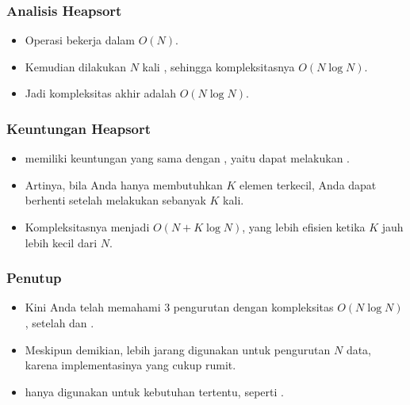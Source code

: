 \begin{frame}
\frametitle{Analisis Heapsort}
\begin{itemize}
  \item Operasi  bekerja dalam $O(N)$.
  \item Kemudian dilakukan $N$ kali , sehingga kompleksitasnya $O(N\log{N})$.
  \item Jadi kompleksitas akhir \pheapsort adalah $O(N\log{N})$.
\end{itemize}
\end{frame}

\begin{frame}
\frametitle{Keuntungan Heapsort}
\begin{itemize}
  \item \pHeapsort memiliki keuntungan yang sama dengan , yaitu dapat melakukan .
  \item Artinya, bila Anda hanya membutuhkan $K$ elemen terkecil, Anda dapat berhenti setelah melakukan  sebanyak $K$ kali.
  \item Kompleksitasnya menjadi $O(N + K \log{N})$, yang lebih efisien ketika $K$ jauh lebih kecil dari $N$.
\end{itemize}
\end{frame}

\begin{frame}
\frametitle{Penutup}
\begin{itemize}
  \item Kini Anda telah memahami 3 pengurutan dengan kompleksitas $O(N \log{N})$, setelah  dan .
  \item Meskipun demikian, \pheapsort lebih jarang digunakan untuk pengurutan $N$ data, karena implementasinya yang cukup rumit.
  \item \pHeapsort hanya digunakan untuk kebutuhan tertentu, seperti .
\end{itemize}
\end{frame}




